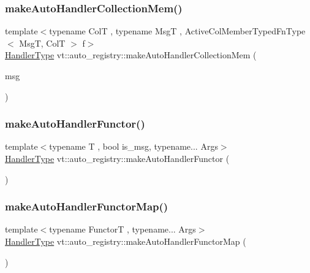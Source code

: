 \subsubsection{\texorpdfstring{make\+Auto\+Handler\+Collection\+Mem()}{makeAutoHandlerCollectionMem()}}
{\footnotesize\ttfamily template$<$typename ColT , typename MsgT , Active\+Col\+Member\+Typed\+Fn\+Type$<$ Msg\+T, Col\+T $>$ f$>$ \\
\hyperlink{namespacevt_af64846b57dfcaf104da3ef6967917573}{Handler\+Type} vt\+::auto\+\_\+registry\+::make\+Auto\+Handler\+Collection\+Mem (\begin{DoxyParamCaption}\item[{MsgT $\ast$const}]{msg }\end{DoxyParamCaption})\hspace{0.3cm}{\ttfamily [inline]}}

\mbox{\label{namespacevt_1_1auto__registry_a473fb7ec675cc28fde0d6b0c5b19ac19}} 
\subsubsection{\texorpdfstring{make\+Auto\+Handler\+Functor()}{makeAutoHandlerFunctor()}}
{\footnotesize\ttfamily template$<$typename T , bool is\+\_\+msg, typename... Args$>$ \\
\hyperlink{namespacevt_af64846b57dfcaf104da3ef6967917573}{Handler\+Type} vt\+::auto\+\_\+registry\+::make\+Auto\+Handler\+Functor (\begin{DoxyParamCaption}{ }\end{DoxyParamCaption})\hspace{0.3cm}{\ttfamily [inline]}}

\mbox{\label{namespacevt_1_1auto__registry_a64989cf40ed8fc5266f9eb67607f4842}} 
\subsubsection{\texorpdfstring{make\+Auto\+Handler\+Functor\+Map()}{makeAutoHandlerFunctorMap()}}
{\footnotesize\ttfamily template$<$typename FunctorT , typename... Args$>$ \\
\hyperlink{namespacevt_af64846b57dfcaf104da3ef6967917573}{Handler\+Type} vt\+::auto\+\_\+registry\+::make\+Auto\+Handler\+Functor\+Map (\begin{DoxyParamCaption}{ }\end{DoxyParamCaption})\hspace{0.3cm}{\ttfamily [inline]}}

